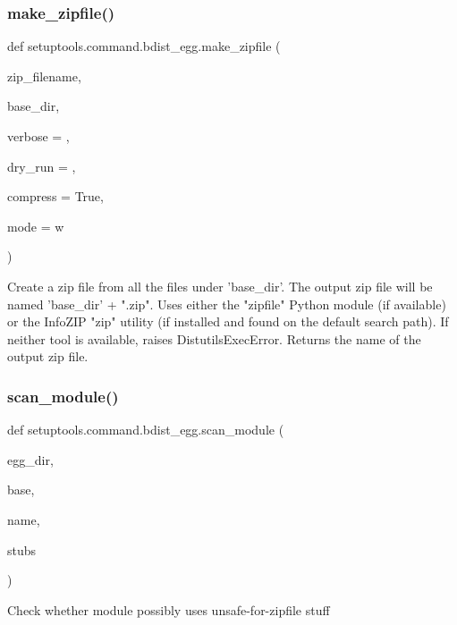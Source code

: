 \subsubsection{\texorpdfstring{make\+\_\+zipfile()}{make\_zipfile()}}
{\footnotesize\ttfamily def setuptools.\+command.\+bdist\+\_\+egg.\+make\+\_\+zipfile (\begin{DoxyParamCaption}\item[{}]{zip\+\_\+filename,  }\item[{}]{base\+\_\+dir,  }\item[{}]{verbose = {},  }\item[{}]{dry\+\_\+run = {},  }\item[{}]{compress = {\ttfamily True},  }\item[{}]{mode = {\ttfamily \textquotesingle{}w\textquotesingle{}} }\end{DoxyParamCaption})}

\begin{DoxyVerb}Create a zip file from all the files under 'base_dir'.  The output
zip file will be named 'base_dir' + ".zip".  Uses either the "zipfile"
Python module (if available) or the InfoZIP "zip" utility (if installed
and found on the default search path).  If neither tool is available,
raises DistutilsExecError.  Returns the name of the output zip file.
\end{DoxyVerb}
 \mbox{\label{namespacesetuptools_1_1command_1_1bdist__egg_a7934760ce13e5b455dbd1d6d846ceb03}} 
\subsubsection{\texorpdfstring{scan\+\_\+module()}{scan\_module()}}
{\footnotesize\ttfamily def setuptools.\+command.\+bdist\+\_\+egg.\+scan\+\_\+module (\begin{DoxyParamCaption}\item[{}]{egg\+\_\+dir,  }\item[{}]{base,  }\item[{}]{name,  }\item[{}]{stubs }\end{DoxyParamCaption})}

\begin{DoxyVerb}Check whether module possibly uses unsafe-for-zipfile stuff\end{DoxyVerb}
 \mbox{\label{namespacesetuptools_1_1command_1_1bdist__egg_a475ca685e10db35e7fdf57cf2d1cad05}} 
